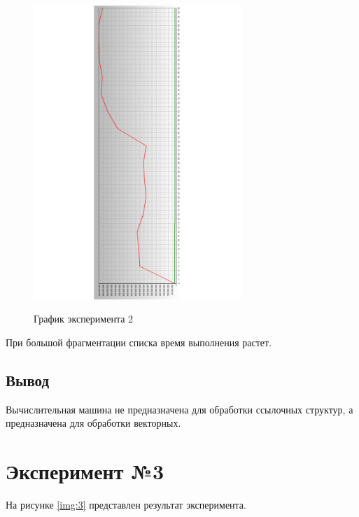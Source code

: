 \begin{figure}[H]
	\caption{График эксперимента 2}
	\includegraphics[width=0.7\textwidth, angle=90]{img/2.pdf}
	\label{img:2}
\end{figure}

При большой фрагментации списка время выполнения растет.

\subsection*{Вывод}

Вычислительная машина не предназначена для обработки ссылочных структур, а предназначена для обработки векторных.

\section{Эксперимент №3}

На рисунке \ref{img:3} представлен результат эксперимента.

